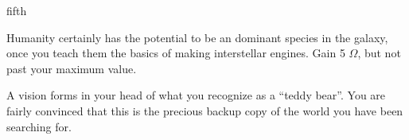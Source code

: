 \documentclass[notebook]{guildcamp1}
\begin{document}
\begin{page}{fifth}

Humanity certainly has the potential to be an dominant species in the galaxy, once you teach them the basics of making interstellar engines.
Gain 5 $\Omega$, but not past your maximum value.

A vision forms in your head of what you recognize as a ``teddy bear''. You are fairly convinced that this is the precious backup copy of the world you have been searching for.
\end{page}

\endnotebook
\end{document}

